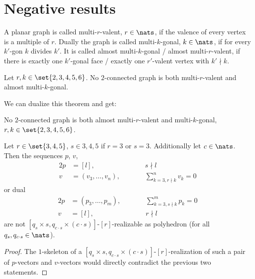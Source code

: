 \section{Negative results}\label{sec:negative:results}

\begin{definition} A planar graph is called multi-$r$-valent, $r \in \nats$, if the valence of every vertex is a multiple of $r$. Dually the graph is called multi-$k$-gonal, $k \in \nats$, if for every $k'$-gon $k$ divides $k'$. It is called almost multi-$k$-gonal / almost multi-$r$-valent, if there is exactly one $k'$-gonal face / exactly one $r'$-valent vertex with $k' \nmid k$.
\end{definition}

\begin{theorem} Let $r, k \in \set{2, 3, 4, 5, 6}$. No $2$-connected graph is both multi-$r$-valent and almost multi-$k$-gonal.
\end{theorem}

We can dualize this theorem and get:
\begin{corollary} No $2$-connected graph is both almost multi-$r$-valent and multi-$k$-gonal, $r, k \in \set{2, 3, 4, 5, 6}$.
\end{corollary}

\begin{corollary}
  Let $r \in \set{3, 4, 5}$, $s \in {3, 4, 5}$ if $r = 3$ or $s = 3$. Additionally let $c \in \nats$. Then the sequences $p$, $v$,
  \begin{alignat*}{2}
    p &= [l], & \qquad&s \nmid l \\
    v &= (v_3, \dots, v_n), & &\sum_{k = 3, r \nmid k}^n v_k = 0
  \end{alignat*}
  or dual
  \begin{alignat*}{2}
    p &= (p_3, \dots, p_m), & \qquad&\sum_{k = 3, s \nmid k}^m p_k = 0\\
    v &= [l], & &r \nmid l
  \end{alignat*}
  are not $[q_s \times s, q_{c \cdot s} \times (c \cdot s)]$-$[r]$-realizable as polyhedron (for all $q_s, q_{c \cdot s} \in \nats$).
\begin{proof}
  The $1$-skeleton of a $[q_s \times s, q_{c \cdot s} \times (c \cdot s)]$-$[r]$-realization of such a pair of $p$-vectors and $v$-vectors would directly contradict the previous two statements.
\end{proof}
\end{corollary}

